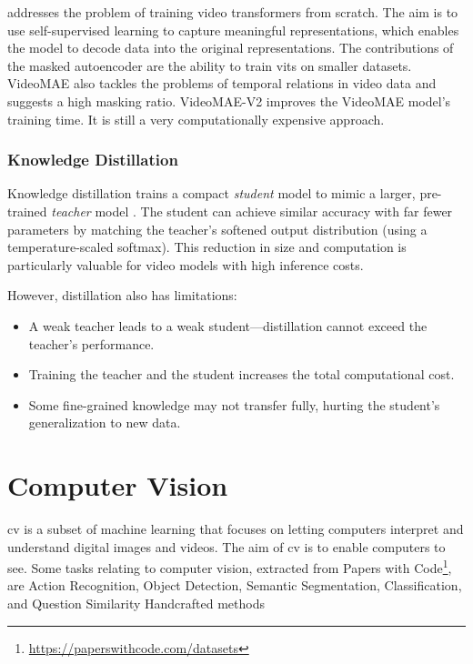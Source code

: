 \textcite{tong_videomae_2022} addresses the problem of training video transformers from scratch. The aim is to use self-supervised learning to capture meaningful representations, which enables the model to decode data into the original representations. The contributions of the masked autoencoder \cite{tong_videomae_2022} are the ability to train \acrshort{vit}s on smaller datasets. VideoMAE \cite{tong_videomae_2022} also tackles the problems of temporal relations in video data and suggests a high masking ratio. VideoMAE-V2 \cite{wang_videomae_2023} improves the VideoMAE model's training time. It is still a very computationally expensive approach. 


\subsubsection{Knowledge Distillation}
\label{sssec:knowledge_distillation}

Knowledge distillation trains a compact \emph{student} model to mimic a larger, pre-trained \emph{teacher} model \cite{denize_comedian_2024, li_videomamba_2024, bose_soccerkdnet_2023}. The student can achieve similar accuracy with far fewer parameters by matching the teacher's softened output distribution (using a temperature-scaled softmax). This reduction in size and computation is particularly valuable for video models with high inference costs.

However, distillation also has limitations:
\begin{itemize}
    \item A weak teacher leads to a weak student—distillation cannot exceed the teacher's performance.
    \item Training the teacher and the student increases the total computational cost.
    \item Some fine-grained knowledge may not transfer fully, hurting the student's generalization to new data.
\end{itemize}


\section{Computer Vision} 
\label{sec:computer_vision}

\acrfull{cv} is a subset of machine learning that focuses on letting computers interpret and understand digital images and videos. The aim of \acrlong{cv} is to enable computers to see. Some tasks relating to computer vision, extracted from Papers with Code\footnote{\url{https://paperswithcode.com/datasets}}, are Action Recognition, Object Detection, Semantic Segmentation, Classification, and Question Similarity {Handcrafted methods}

